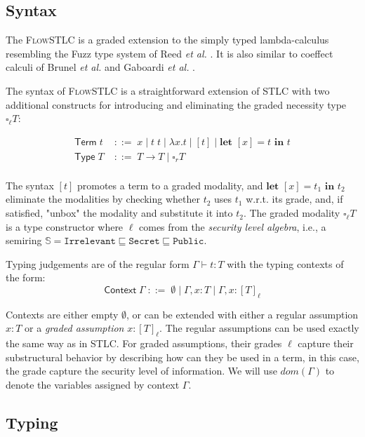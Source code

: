 \documentclass[conference]{IEEEtran}
\newcommand\unp[3]{\textbf{let }[#1]=#2\textbf{ in }#3}
\newcommand\gradedt[2]{\square_#1 #2}
\newcommand\public{\texttt{Public}}
\newcommand\secret{\texttt{Secret}}
\newcommand\irrele{\texttt{Irrelevant}}
\newcommand\secure{\mathbb{S}}
\begin{document}
\subsection{Syntax}

The \textsc{FlowSTLC} is a graded extension to the simply typed lambda-calculus resembling the Fuzz type system of Reed \emph{et al.} \cite{reeddistance}. It is also similar to coeffect calculi of Brunel \emph{et al.} \cite{brunel2014core} and Gaboardi \emph{et al.} \cite{gaboardi2016combining}.

The syntax of \textsc{FlowSTLC} is a straightforward extension of STLC with two additional constructs for introducing and eliminating the graded necessity type $\gradedt{\ell}{T}$:

$$
\begin{aligned}
	\textsf{Term}\;t\;&::=\;x\;|\;t\; t\;|\;\lambda x.t\;|\;[t]\;|\;\textbf{let }[x]=t\textbf{ in }t\\
	\textsf{Type}\;T\;&::=\;T\to T\;|\;\square_r T\\
\end{aligned}
$$

The syntax $[t]$ promotes a term to a graded modality, and $\unp{x}{t_1}{t_2}$ eliminate the modalities by checking whether $t_2$ uses $t_1$ w.r.t. its grade, and, if satisfied, "unbox" the modality and substitute it into $t_2$. The graded modality $\gradedt{\ell}{T}$ is a type constructor where $\ell$ comes from the \emph{security level algebra}, i.e., a semiring $\secure=\irrele\sqsubseteq\secret\sqsubseteq\public$.

Typing judgements are of the regular form $\Gamma\vdash t:T$ with the typing contexts of the form:
$$
\textsf{Context}\;\Gamma\;::=\;\emptyset\;|\;\Gamma,x:T\;|\;\Gamma,x:[T]_\ell
$$

Contexts are either empty $\emptyset$, or can be extended with either a regular assumption $x:T$ or a \emph{graded assumption} $x:[T]_\ell$. The regular assumptions can be used exactly the same way as in STLC. For graded assumptions, their grades $\ell$ capture their substructural behavior by describing how can they be used in a term, in this case, the grade capture the security level of information. We will use $dom(\Gamma)$ to denote the variables assigned by context $\Gamma$.

\subsection{Typing}
\end{document}
